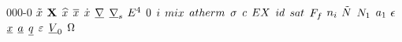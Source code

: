 \begin{mitframe}{000-0}
$\exvecthree$ \newline
$\matrx$ \newline
$\intscal$ \newline
$\partmol$ \newline
$\tderiv$ \newline
$\gradop$ \newline
$\surfgradop$ \newline
$\axbiop$ \newline
$\init$ \newline
$\state$ \newline
$\mixfunc$ \newline
$\atfunc$ \newline
$\bound$ \newline
$\crit$ \newline
$\exfunc$ \newline
$\idgas$ \newline
$\satvap$ \newline
$\fricforce$ \newline
$\molspecies{i}$ \newline
$\totmoles$ \newline
$\molesi{1}$ \newline
$\activityi{1}$ \newline
$\welldepth$ \newline
$\gendisp$ \newline
$\totalsa$ \newline
$\eleccharge$ \newline
$\elecpot$ \newline
$\origvol$ \newline
$\linstrain$ \newline



\end{mitframe}
